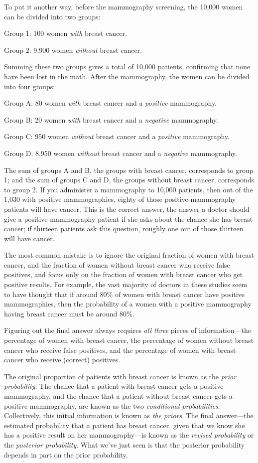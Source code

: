 {
 To put it another way, before the mammography screening, the
10,000 women can be divided into two groups:}

{
 Group 1: 100 women \textit{with} breast cancer.}

{
 Group 2: 9,900 women \textit{without} breast cancer.}

{
 Summing these two groups gives a total of 10,000 patients,
confirming that none have been lost in the math. After the mammography,
the women can be divided into four groups:}

{
 Group A: 80 women \textit{with} breast cancer and a
\textit{positive} mammography.}

{
 Group B: 20 women \textit{with} breast cancer and a
\textit{negative} mammography.}

{
 Group C: 950 women \textit{without} breast cancer and a
\textit{positive} mammography.}

{
 Group D: 8,950 women \textit{without} breast cancer and a
\textit{negative} mammography.}

{
 The sum of groups A and B, the groups with breast cancer,
corresponds to group 1; and the sum of groups C and D, the groups
without breast cancer, corresponds to group 2. If you administer a
mammography to 10,000 patients, then out of the 1,030 with positive
mammographies, eighty of those positive-mammography patients will have
cancer. This is the correct answer, the answer a doctor should give a
positive-mammography patient if she asks about the chance she has
breast cancer; if thirteen patients ask this question, roughly one out
of those thirteen will have cancer.}

{
 The most common mistake is to ignore the original fraction of
women with breast cancer, and the fraction of women without breast
cancer who receive false positives, and focus only on the fraction of
women with breast cancer who get positive results. For example, the
vast majority of doctors in these studies seem to have thought that if
around 80\% of women with breast cancer have positive mammographies,
then the probability of a women with a positive mammography having
breast cancer must be around 80\%.}

{
 Figuring out the final answer always requires \textit{all three}
pieces of information---the percentage of women with breast cancer, the
percentage of women without breast cancer who receive false positives,
and the percentage of women with breast cancer who receive (correct)
positives.}

{
 The original proportion of patients with breast cancer is known as
the \textit{prior probability}. The chance that a patient with breast
cancer gets a positive mammography, and the chance that a patient
without breast cancer gets a positive mammography, are known as the two
\textit{conditional probabilities}. Collectively, this initial
information is known as \textit{the priors}. The final answer---the
estimated probability that a patient has breast cancer, given that we
know she has a positive result on her mammography---is known as the
\textit{revised probability} or the \textit{posterior probability}.
What we've just seen is that the posterior probability
depends in part on the prior probability.}

